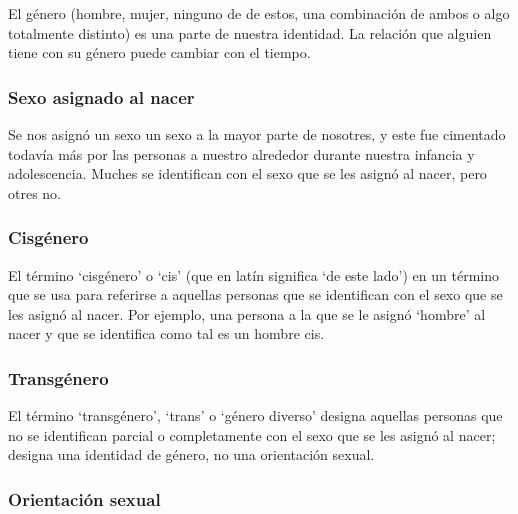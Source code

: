 \documentclass[12pt,openany]{book}
\begin{document}
El género (hombre, mujer, ninguno de de estos, una combinación de ambos o algo totalmente distinto) es una parte de nuestra identidad. La relación que alguien tiene con su género puede cambiar con el tiempo.

\subsubsection*{Sexo asignado al nacer}

Se nos asignó un sexo un sexo a la mayor parte de nosotres, y este fue cimentado todavía más por las personas a nuestro alrededor durante nuestra infancia y adolescencia. Muches se identifican con el sexo que se les asignó al nacer, pero otres no. 

\subsubsection*{Cisgénero}

El término `cisgénero' o `cis' (que en latín significa `de este lado') en un término que se usa para referirse a aquellas personas que se identifican con el sexo que se les asignó al nacer. Por ejemplo, una persona a la que se le asignó `hombre' al nacer y que se identifica como tal es un hombre cis.

\begin{figure}[h]
    \centering
\end{figure}

\subsubsection*{Transgénero}

El término `transgénero', `trans' o `género diverso' designa aquellas personas que no se identifican parcial o completamente con el sexo que se les asignó al nacer; designa una identidad de género, no una orientación sexual.

\subsubsection*{Orientación sexual}
\end{document}
